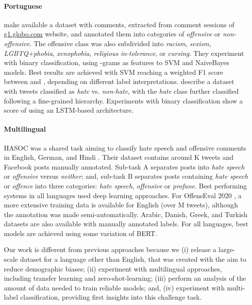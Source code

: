 \documentclass[11pt,a4paper]{article}
\begin{document}
\paragraph{Portuguese}  make available a dataset with  comments, extracted from comment sessions of \url{g1.globo.com} website, and annotated them into categories of \textit{offensive} or \textit{non-offensive}. The offensive class was also subdivided into \textit{racism}, \textit{sexism}, \textit{LGBTQ+phobia}, \textit{xenophobia}, \textit{religious in-tolerance}, or \textit{cursing}. They experiment with binary classification, using -grams as features to SVM and NaiveBayes models. Best results are achieved with SVM reaching a weighted F1 score between  and , depending on different label interpretations.  describe a dataset with  tweets classified as \textit{hate} vs. \textit{non-hate}, with the \textit{hate} class further classified following a fine-grained hierarchy. Experiments with binary classification show a  score of  using an LSTM-based architecture.

\paragraph{Multilingual} HASOC was a shared task aiming to classify hate speech and offensive comments in English, German, and Hindi \cite{mandl-etal-2019}. Their dataset contains around K tweets and Facebook posts manually annotated. Sub-task A separates posts into \textit{hate speech} or \textit{offensive} versus \textit{neither}; and, sub-task B separates posts containing \textit{hate speech} or \textit{offence} into three categories: \textit{hate speech}, \textit{offensive} or \textit{profane}. Best performing systems in all languages used deep learning approaches.
For OffensEval 2020 \cite{zampieri-etal-2020-semeval}, a more extensive training data is available for English (over M tweets), although the annotation was made semi-automatically. Arabic, Danish, Greek, and Turkish datasets are also available with manually annotated labels. For all languages, best models are achieved using some variation of BERT.    

Our work is different from previous approaches because we (i) release a large-scale dataset for a language other than English, that was created with the aim to reduce demographic biases; (ii) experiment with multilingual approaches, including transfer learning and zero-shot-learning; (iii) perform an analysis of the amount of data needed to train reliable models; and, (iv) experiment with multi-label classification, providing first insights into this challenge task.
\end{document}
